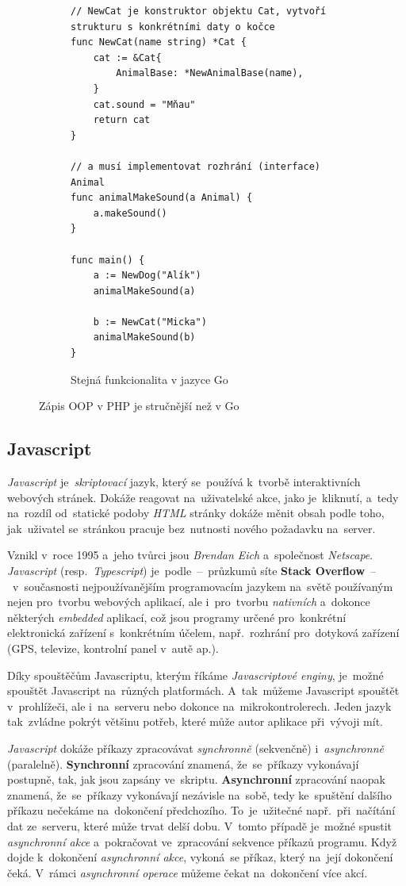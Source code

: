 \documentclass[10pt,a4paper]{article}
\begin{document}
\begin{figure}
\begin{subfigure}[b]{0.45\linewidth}
\begin{verbatim}
// NewCat je konstruktor objektu Cat, vytvoří strukturu s konkrétními daty o kočce
func NewCat(name string) *Cat {
	cat := &Cat{
		AnimalBase: *NewAnimalBase(name),
	}
	cat.sound = "Mňau"
	return cat
}

// a musí implementovat rozhrání (interface) Animal
func animalMakeSound(a Animal) {
    a.makeSound()
}

func main() {
	a := NewDog("Alík")
	animalMakeSound(a)

	b := NewCat("Micka")
	animalMakeSound(b)
}
                    \end{verbatim}
                    \caption{Stejná funkcionalita v jazyce Go}
                \end{subfigure}
                \caption{Zápis OOP v PHP je stručnější než v Go}
                \label{oop:difference}
            \end{figure}

        \subsection{Javascript}
            \emph{Javascript} je~\emph{skriptovací} jazyk, který se~používá k~tvorbě interaktivních webových stránek. Dokáže reagovat na~uživatelské akce, jako je~kliknutí, a~tedy na~rozdíl od~statické podoby \emph{HTML} stránky dokáže měnit obsah podle toho, jak~uživatel se~stránkou pracuje bez~nutnosti nového požadavku na~server.

            Vznikl v~roce 1995 a~jeho tvůrci jsou \emph{Brendan Eich} a~společnost \emph{Netscape}. \emph{Javascript} (resp.~\emph{Typescript}) je~podle~--~průzkumů síte \textbf{Stack Overflow}~--~v~současnosti nejpoužívanějším programovacím jazykem na~světě používaným nejen pro~tvorbu webových aplikací, ale i~pro~tvorbu \emph{nativních} a~dokonce některých \emph{embedded} aplikací, což jsou programy určené pro~konkrétní elektronická zařízení s~konkrétním účelem, např.~rozhrání pro~dotyková zařízení (GPS, televize, kontrolní panel v~autě ap.).

            Díky spouštěčům Javascriptu, kterým říkáme \emph{Javascriptové enginy}, je~možné spouštět Javascript na~různých platformách. A~tak~můžeme Javascript spouštět v~prohlížeči, ale i~na~serveru nebo dokonce na~mikrokontrolerech. Jeden jazyk tak~zvládne pokrýt většinu potřeb, které může autor aplikace při~vývoji mít.

            \emph{Javascript} dokáže příkazy zpracovávat \emph{synchronně} (sekvenčně) i~\emph{asynchronně} (paralelně). \textbf{Synchronní} zpracování znamená, že~se~příkazy vykonávají postupně, tak, jak jsou zapsány ve~skriptu. \textbf{Asynchronní} zpracování naopak znamená, že~se~příkazy vykonávají nezávisle na~sobě, tedy ke~spuštění dalšího příkazu nečekáme na~dokončení předchozího. To~je~užitečné např.~při~načítání dat ze~serveru, které může trvat delší dobu. V~tomto případě je~možné spustit \emph{asynchronní akce} a~pokračovat ve~zpracování sekvence příkazů programu. Když dojde k~dokončení \emph{asynchronní akce}, vykoná~se příkaz, který na~její dokončení čeká. V~rámci \emph{asynchronní operace} můžeme čekat na~dokončení více akcí. \cite{kantor_javascript}
\end{document}

